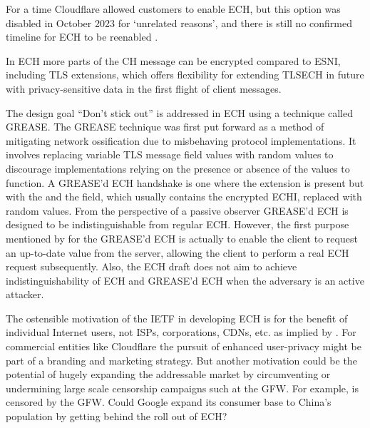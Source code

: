 For a time Cloudflare allowed customers to enable \ac{ECH},
but this option was disabled in October 2023
for `unrelated reasons',
and there is still no confirmed timeline for
\ac{ECH} to be reenabled \citep{cloudflare-ech-disabled}.

In \ac{ECH} more parts of the \ac{CH} message
can be encrypted compared to \ac{ESNI},
including \ac{TLS} extensions,
which offers flexibility for extending
\ac{TLS}\ac{ECH} in future with privacy-sensitive data
in the first flight of client messages.

The design goal ``Don't stick out'' is addressed
in \ac{ECH} using a technique called \ac{GREASE}.
The \ac{GREASE} technique was first put forward as
a method of mitigating network ossification due to
misbehaving protocol implementations.
It involves replacing variable \ac{TLS} message field values with random values to discourage
implementations relying on the presence or absence
of the values to function.
A \ac{GREASE}'d \ac{ECH} handshake is one where the \varech{} extension is present but with the  and the  field, which usually contains the encrypted \ac{ECHI}, replaced with random values.
From the perspective of a passive observer \ac{GREASE}'d \ac{ECH} is designed to be
indistinguishable from regular \ac{ECH}.
However, the first purpose mentioned by \cite{esni} for the \ac{GREASE}'d \ac{ECH} is actually
to enable the client to request an up-to-date  value
from the server,
allowing the client to perform
a real \ac{ECH} request subsequently.
Also, the \ac{ECH} draft does not aim to achieve indistinguishability of \ac{ECH} and \ac{GREASE}'d \ac{ECH} when the adversary
is an active attacker.



The ostensible motivation of the \ac{IETF} in
developing \ac{ECH} is for the benefit of individual Internet users, not \acp{ISP},
corporations, \acp{CDN}, etc. as implied by \cite{rfc8890internet-is-for-end-users}.
For commercial entities like Cloudflare the
pursuit of enhanced user-privacy might be part of
a branding and marketing strategy.
But another motivation could be the potential of
hugely expanding the addressable market by
circumventing or undermining large scale
censorship campaigns such at the \ac{GFW}.
For example,  is censored by the \ac{GFW}.
Could Google expand its consumer base to
China's population by getting behind the roll out of \ac{ECH}?

